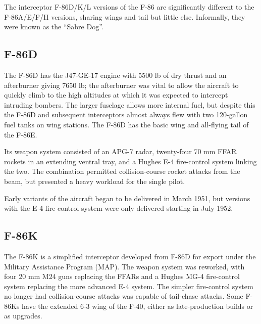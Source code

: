 The interceptor F-86D/K/L versions of the F-86 are significantly different to the F-86A/E/F/H versions, sharing wings and tail but little else. Informally, they were known as the “Sabre Dog”.

\subsection{F-86D}

The F-86D has the J47-GE-17 engine with 5500 lb of dry thrust and an afterburner giving 7650 lb; the afterburner was vital to allow the aircraft to quickly climb to the high altitudes at which it was expected to intercept intruding bombers. The larger fuselage allows more internal fuel, but despite this the F-86D and subsequent interceptors almost always flew with two 120-gallon fuel tanks on wing stations. The F-86D has the basic wing and all-flying tail of the F-86E.%

Its weapon system consisted of an APG-7 radar, twenty-four 70 mm FFAR rockets in an extending ventral tray, and a Hughes E-4 fire-control system linking the two. The combination permitted collision-course rocket attacks from the beam, but presented a heavy workload for the single pilot.

Early variants of the aircraft began to be delivered in March 1951, but versions with the E-4 fire control system were only delivered starting in July 1952.

\subsection{F-86K}

The F-86K is a simplified interceptor developed from F-86D for export under the Military Assistance Program (MAP). The weapon system was reworked, with four 20 mm M24 guns replacing the FFARs and a Hughes MG-4 fire-control system replacing the more advanced E-4 system. The simpler fire-control system no longer had collision-course attacks was capable of tail-chase attacks. Some F-86Ks have the extended 6-3 wing of the F-40, either as late-production builds or as upgrades.%

